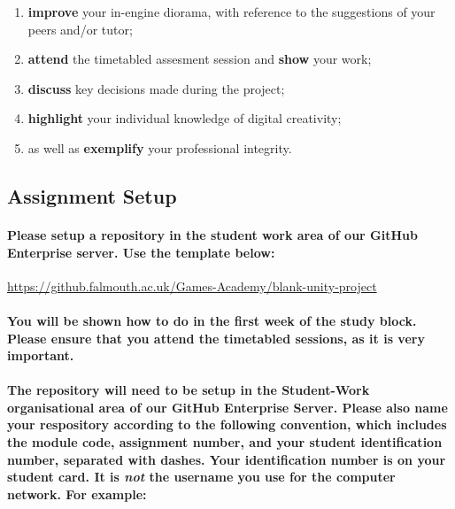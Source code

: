 \documentclass{../../fal_assignment}
\begin{document}
\begin{enumerate}
    	\begin{enumerate}
    	 	\item \textbf{improve} your in-engine diorama, with reference to the suggestions of your peers and/or tutor;
  		\item \textbf{attend} the timetabled assesment session and \textbf{show} your work;  
    		\item \textbf{discuss} key decisions made during the project;
    		\item \textbf{highlight} your individual knowledge of digital creativity;
    		\item as well as \textbf{exemplify} your professional integrity.
	\end{enumerate}
\end{enumerate}

\vspace{1em}

\subsection*{Assignment Setup}

\paragraph{Please setup a repository in the student work area of our GitHub Enterprise server. Use the template below:} 

\url{https://github.falmouth.ac.uk/Games-Academy/blank-unity-project}

\paragraph{You will be shown how to do in the first week of the study block. Please ensure that you attend the timetabled sessions, as it is very important. }

\paragraph{The repository will need to be setup in the \textbf{Student-Work} organisational area of our GitHub Enterprise Server. Please also name your respository according to the following convention, which includes the module code, assignment number, and your student identification number, separated with dashes. Your identification number is on your student card. It is \textit{not} the username you use for the computer network. For example:}
\end{document}
